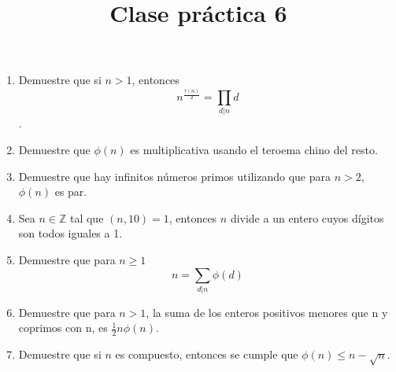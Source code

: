 \documentclass{article}
\title{Clase pr\'actica 6}
\begin{document}
\maketitle
\begin{enumerate}
	\item Demuestre que si $n>1$, entonces $$n^{\frac{\tau(n)}{2}} = \prod_{d | n} d$$.
	\item Demuestre que $\phi(n)$ es multiplicativa usando el teroema chino del resto.
	\item Demuestre que hay infinitos n\'umeros primos utilizando que para $n>2$, $\phi(n)$ es par.
	\item Sea $n \in \mathbb{Z}$ tal que $(n, 10) = 1$, entonces $n$ divide a un entero cuyos d\'igitos son todos iguales a 1.
	\item Demuestre que para $n \geq 1$
	$$n = \sum_{d|n} \phi(d)$$
	\item Demuestre que para $n>1$, la suma de los enteros positivos menores que n y coprimos con n, es $\frac{1}{2}n\phi(n)$.
	\item Demuestre que si $n$ es compuesto, entonces se cumple que $\phi(n) \leq n - \sqrt{n}$.
\end{enumerate}
\end{document}

